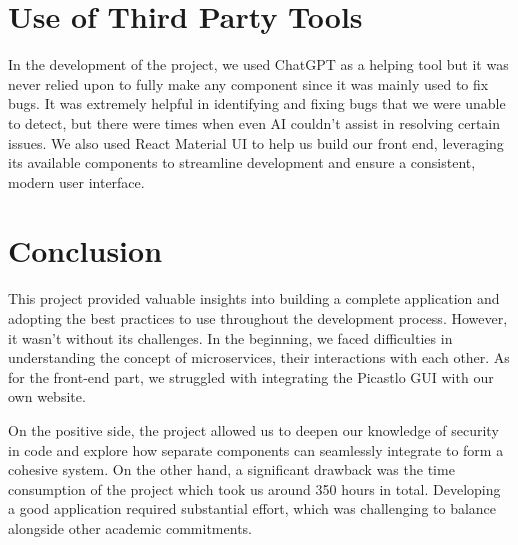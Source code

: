 \documentclass[acmart, nonacm]{acmart}
\begin{document}
\section{Use of Third Party Tools}
In the development of the project, we used ChatGPT as a helping tool but it was never relied upon to fully make any component since it was mainly used to fix bugs.
It was extremely helpful in identifying and fixing bugs that we were unable to detect, but there were times when even AI couldn't assist in resolving certain issues.
We also used React Material UI to help us build our front end, leveraging its available components to streamline development and ensure a consistent, modern user interface.

\section{Conclusion}
This project provided valuable insights into building a complete application and adopting the best practices to use throughout the development process. However, it wasn’t without its challenges. 
In the beginning, we faced difficulties in understanding the concept of microservices, their interactions with each other. As for the front-end part, we struggled with integrating the Picastlo 
GUI with our own website.

On the positive side, the project allowed us to deepen our knowledge of security in code and explore how separate components can seamlessly integrate to form a cohesive system.
On the other hand, a significant drawback was the time consumption of the project which took us around 350 hours in total. Developing a good application required substantial effort, which was challenging to balance alongside other 
academic commitments.
\end{document}
